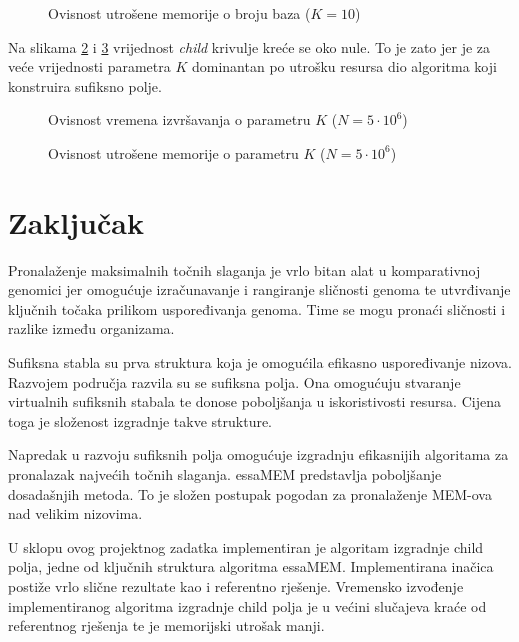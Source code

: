 \documentclass[times, utf8, seminar, numeric]{fer}
\begin{document}
\begin{figure}[!h]
	\centering
	\def\svgwidth{.7\columnwidth}
	
  \caption{Ovisnost utrošene memorije o broju baza ($K = 10$)}
  \label{fig:memory-base_number}
\end{figure}

Na slikama \ref{fig:time-k} i \ref{fig:memory-k} vrijednost \textit{child} krivulje kreće se oko nule. To je zato jer je za veće vrijednosti parametra $K$ dominantan po utrošku resursa dio algoritma koji konstruira sufiksno polje.

\begin{figure}[!h]
	\centering
	\def\svgwidth{.7\columnwidth}
	
  \caption{Ovisnost vremena izvršavanja o parametru $K$ ($N = 5 \cdot 10^6$)}
  \label{fig:time-k}
\end{figure}

\begin{figure}[!h]
	\centering
	\def\svgwidth{.7\columnwidth}
	
  \caption{Ovisnost utrošene memorije o parametru $K$ ($N = 5 \cdot 10^6$)}
  \label{fig:memory-k}
\end{figure}

\chapter{Zaključak}
Pronalaženje maksimalnih točnih slaganja je vrlo bitan alat u komparativnoj genomici jer omogućuje izračunavanje i rangiranje sličnosti genoma te utvrđivanje ključnih točaka prilikom uspoređivanja genoma. Time se mogu pronaći sličnosti i razlike između organizama. 

Sufiksna stabla su prva struktura koja je omogućila efikasno uspoređivanje nizova. Razvojem područja razvila su se sufiksna polja. Ona omogućuju stvaranje virtualnih sufiksnih stabala te donose poboljšanja u iskoristivosti resursa. Cijena toga je složenost izgradnje takve strukture.

Napredak u razvoju sufiksnih polja omogućuje izgradnju efikasnijih algoritama za pronalazak najvećih točnih slaganja. essaMEM predstavlja poboljšanje dosadašnjih metoda. To je složen postupak pogodan za pronalaženje MEM-ova nad velikim nizovima. 

U sklopu ovog projektnog zadatka implementiran je algoritam izgradnje child polja, jedne od ključnih struktura algoritma essaMEM. Implementirana inačica postiže vrlo slične rezultate kao i referentno rješenje. Vremensko izvođenje implementiranog algoritma izgradnje child polja je u većini slučajeva kraće od referentnog rješenja te je memorijski utrošak manji.
\end{document}
